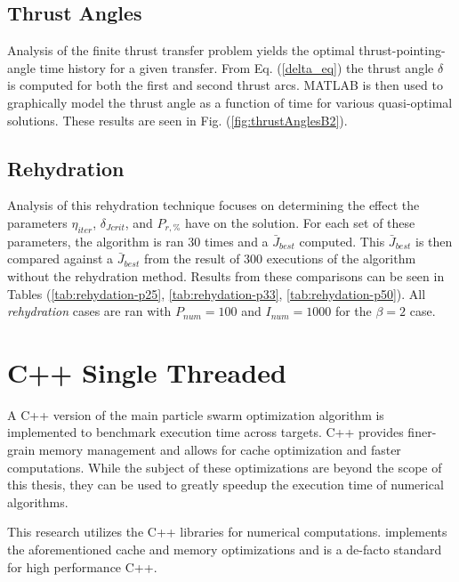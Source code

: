 \subsection{Thrust Angles}

\noindent Analysis of the finite thrust transfer problem yields the optimal thrust-pointing-angle time history for a given transfer. 
From Eq. (\ref{delta_eq}) the thrust angle $\delta$ is computed for both the first and second thrust arcs. MATLAB is then used
to graphically model the thrust angle as a function of time for various quasi-optimal solutions. These results are seen in 
Fig. (\ref{fig:thrustAnglesB2}). \newline

\subsection{Rehydration}

\noindent Analysis of this rehydration technique focuses on determining the effect the parameters $\eta_{iter}$, $\delta_{Jcrit}$,
and $P_{r,\text{\%}}$ have on the solution. For each set of these parameters, the algorithm is ran 30 times and a $\bar{J}_{best}$
computed. This $\bar{J}_{best}$ is then compared against a $\bar{J}_{best}$ from the result of 300 executions of the algorithm without
the rehydration method. Results from these comparisons can be seen in Tables 
(\ref{tab:rehydation-p25}, \ref{tab:rehydation-p33}, \ref{tab:rehydation-p50}).
All \textit{rehydration} cases are ran with $P_{num} = 100$ and $I_{num} = 1000$ for the $\beta=2$ case.



\section{C++ Single Threaded}

\noindent A C++ version of the main particle swarm optimization algorithm is implemented to benchmark execution time across targets.
C++ provides finer-grain memory management and allows for cache optimization and faster computations.
While the subject of these optimizations are beyond the scope of this thesis, they can be used to greatly speedup the execution time
of numerical algorithms. \newline

\noindent This research utilizes the C++  libraries for numerical computations.
 implements the aforementioned cache and memory optimizations and is a de-facto standard
for high performance C++.

